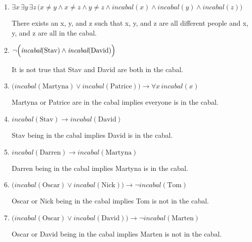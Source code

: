 \documentclass[11pt,fleqn]{article}
\begin{document}
\begin{enumerate}[label= (\roman*), leftmargin=*]
  \item \( \exists x\,\exists y\,\exists z\, \bigl( x \neq y \wedge x \neq z \wedge y \neq z \wedge \textit{incabal}(x) \wedge \textit{incabal}(y) \wedge \textit{incabal}(z) \bigr) \)
  
  There exists an x, y, and z such that x, y, and z are all different people and x, y, and z are all in the cabal.
  \item \( \neg\Bigl( \textit{incabal}(\text{Stav}) \wedge \textit{incabal}(\text{David}) \Bigr) \)
  
  It is not true that Stav and David are both in the cabal.
  \item \( \bigl( \textit{incabal}(\text{Martyna}) \vee \textit{incabal}(\text{Patrice}) \bigr)
  \to \forall x\, \textit{incabal}(x) \)

  Martyna or Patrice are in the cabal implies everyone is in the cabal.
  \item \( \textit{incabal}(\text{Stav}) \to \textit{incabal}(\text{David}) \)
  
  Stav being in the cabal implies David is in the cabal.
  \item \( \textit{incabal}(\text{Darren}) \to \textit{incabal}(\text{Martyna}) \)
  
  Darren being in the cabal implies Martyna is in the cabal.
  \item \( \bigl( \textit{incabal}(\text{Oscar}) \vee \textit{incabal}(\text{Nick}) \bigr)
  \to \neg \textit{incabal}(\text{Tom}) \)

  Oscar or Nick being in the cabal implies Tom is not in the cabal.
  \item \( \bigl( \textit{incabal}(\text{Oscar}) \vee \textit{incabal}(\text{David}) \bigr)
  \to \neg \textit{incabal}(\text{Marten}) \)

  Oscar or David being in the cabal implies Marten is not in the cabal.
\end{enumerate}
\end{document}
